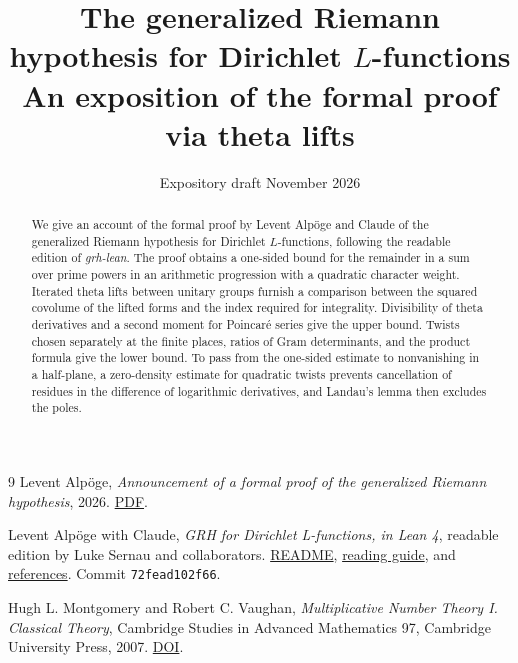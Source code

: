 \documentclass[a4paper,11pt]{article}
\title{The generalized Riemann hypothesis for Dirichlet \(L\)-functions\\[0.45em]
  \large An exposition of the formal proof via theta lifts}
\author{}
\date{\small Expository draft \quad 26 November 2026}
\theoremstyle{plain}
\theoremstyle{definition}
\numberwithin{equation}{section}
\begin{document}
\maketitle

\begin{abstract}
We give an account of the formal proof by Levent Alpöge and Claude
of the generalized Riemann hypothesis for Dirichlet \(L\)-functions,
following the readable edition of \emph{grh-lean}. The proof obtains a
one-sided bound for the remainder in a sum over prime powers in an
arithmetic progression with a quadratic character weight. Iterated
theta lifts between unitary groups furnish a comparison between the
squared covolume of the lifted forms and the index required for
integrality. Divisibility of theta derivatives and a second moment for
Poincaré series give the upper bound. Twists chosen separately at the
finite places, ratios of Gram determinants, and the product formula
give the lower bound. To pass from the one-sided estimate to
nonvanishing in a half-plane, a zero-density estimate for quadratic
twists prevents cancellation of residues in the difference of
logarithmic derivatives, and Landau's lemma then excludes the poles.
\end{abstract}











\begin{thebibliography}{9}
Levent Alpöge, \emph{Announcement of a formal proof of the generalized
Riemann hypothesis}, 2026.
\href{https://alpo.ge/remark.pdf}{PDF}.

Levent Alpöge with Claude, \emph{GRH for Dirichlet L-functions, in Lean 4},
readable edition by Luke Sernau and collaborators.
\href{\upstream/grh/README.md}{README},
\href{\upstream/grh/GUIDE.md}{reading guide}, and
\href{\upstream/grh/REFERENCES.md}{references}.
Commit \texttt{72fead102f66}.

Hugh L. Montgomery and Robert C. Vaughan,
\emph{Multiplicative Number Theory I. Classical Theory},
Cambridge Studies in Advanced Mathematics 97,
Cambridge University Press, 2007.
\href{https://doi.org/10.1017/CBO9780511618314}{DOI}.


\end{thebibliography}


\end{document}
